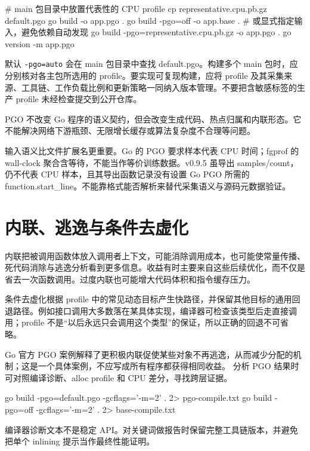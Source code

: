 \documentclass[UTF8,fontset=fandol,openany,11pt]{ctexbook}
\begin{document}
\begin{codeblock}
# main 包目录中放置代表性的 CPU profile
cp representative.cpu.pb.gz default.pgo
go build -o app.pgo .
go build -pgo=off -o app.base .
# 或显式指定输入，避免依赖自动发现
go build -pgo=representative.cpu.pb.gz -o app.pgo .
go version -m app.pgo
\end{codeblock}

默认 \texttt{-\allowbreak{}pgo=auto} 会在 main 包目录中查找 default.pgo。构建多个 main 包时，应分别核对各主包所选用的 profile。要实现可复现构建，应将 profile 及其采集来源、工具链、工作负载比例和更新策略一同纳入版本管理。不要把含敏感标签的生产 profile 未经检查提交到公开仓库。

PGO 不改变 Go 程序的语义契约，但会改变生成代码、热点归属和内联形态。它不能解决网络下游瓶颈、无限增长缓存或算法复杂度不合理等问题。

输入语义比文件扩展名更重要。Go 的 PGO 要求样本代表 CPU 时间；fgprof 的 wall-clock 聚合含等待，不能当作等价训练数据。v0.9.5 虽导出 samples/count，仍不代表 CPU 样本，且其导出函数记录没有设置 Go PGO 所需的 function.start\_line。不能靠格式能否解析来替代采集语义与源码元数据验证。\cite{tools-fgprof-source}

\section{内联、逃逸与条件去虚化}
内联把被调用函数体放入调用者上下文，可能消除调用成本，也可能使常量传播、死代码消除与逃逸分析看到更多信息。收益有时主要来自这些后续优化，而不仅是省去一次函数调用。过度内联也可能增大代码体积和指令缓存压力。

条件去虚化根据 profile 中的常见动态目标产生快路径，并保留其他目标的通用回退路径。例如接口调用大多数落在某具体实现，编译器可检查该类型后走直接调用；profile 不是“以后永远只会调用这个类型”的保证，所以正确的回退不可省略。

Go 官方 PGO 案例解释了更积极内联促使某些对象不再逃逸，从而减少分配的机制；这是一个具体案例，不应写成所有程序都获得相同收益。\cite{go-pgo-blog} 分析 PGO 结果时可对照编译诊断、alloc profile 和 CPU 差分，寻找跨层证据。

\begin{codeblock}
go build -pgo=default.pgo -gcflags='-m=2' . 2> pgo-compile.txt
go build -pgo=off -gcflags='-m=2' . 2> base-compile.txt
\end{codeblock}

编译器诊断文本不是稳定 API。对关键词做报告时保留完整工具链版本，并避免把单个 inlining 提示当作最终性能证明。
\end{document}
